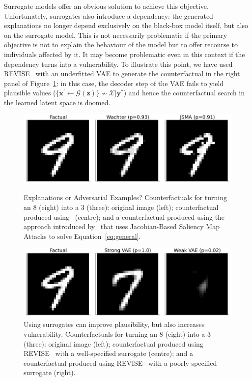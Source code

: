 \documentclass{article}
\begin{document}
Surrogate models offer an obvious solution to achieve this objective. Unfortunately, surrogates also introduce a dependency: the generated explanations no longer depend exclusively on the black-box model itself, but also on the surrogate model. This is not necessarily problematic if the primary objective is not to explain the behaviour of the model but to offer recourse to individuals affected by it. It may become problematic even in this context if the dependency turns into a vulnerability. To illustrate this point, we have used REVISE~\citep{joshi2019realistic} with an underfitted VAE to generate the counterfactual in the right panel of Figure~\ref{fig:vae}: in this case, the decoder step of the VAE fails to yield plausible values ($\{\mathbf{x}^{\prime} \leftarrow \mathcal{G}(\mathbf{z})\} \not\sim \mathcal{X}|\mathbf{y}^*$) and hence the counterfactual search in the learned latent space is doomed.

\begin{figure}
  \centering
  \begin{minipage}[t]{0.45\textwidth}
    \centering
    \includegraphics[width=\textwidth]{../artifacts/results/images/you_may_not_like_it.png}
    \caption{Explanations or Adversarial Examples? Counterfactuals for turning an 8 (eight) into a 3 (three): original image (left); counterfactual produced using~\citet{wachter2017counterfactual} (centre); and a counterfactual produced using the approach introduced by~\citep{schut2021generating} that uses Jacobian-Based Saliency Map Attacks to solve Equation~\ref{eq:general}.}\label{fig:adv}
  \end{minipage}\hfill
  \begin{minipage}[t]{0.45\textwidth}
    \centering
    \includegraphics[width=\textwidth]{../artifacts/results/images/surrogate_gone_wrong.png}
    \caption{Using surrogates can improve plausibility, but also increases vulnerability. Counterfactuals for turning an 8 (eight) into a 3 (three): original image (left); counterfactual produced using REVISE~\citep{joshi2019realistic} with a well-specified surrogate (centre); and a counterfactual produced using REVISE~\citep{joshi2019realistic} with a poorly specified surrogate (right).}\label{fig:vae}
  \end{minipage}
\end{figure}
\end{document}
